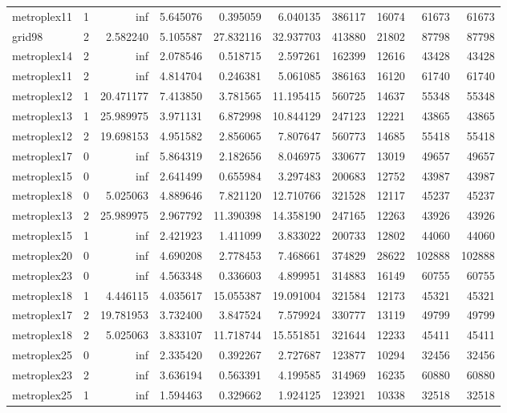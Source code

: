 \begin{longtable}{|l|r|r|r|r|r|r|r|r|r|}
metroplex11 & 1 & inf & 5.645076 & 0.395059 & 6.040135 & 386117 & 16074 & 61673 & 61673 \\
grid98 & 2 & 2.582240 & 5.105587 & 27.832116 & 32.937703 & 413880 & 21802 & 87798 & 87798 \\
metroplex14 & 2 & inf & 2.078546 & 0.518715 & 2.597261 & 162399 & 12616 & 43428 & 43428 \\
metroplex11 & 2 & inf & 4.814704 & 0.246381 & 5.061085 & 386163 & 16120 & 61740 & 61740 \\
metroplex12 & 1 & 20.471177 & 7.413850 & 3.781565 & 11.195415 & 560725 & 14637 & 55348 & 55348 \\
metroplex13 & 1 & 25.989975 & 3.971131 & 6.872998 & 10.844129 & 247123 & 12221 & 43865 & 43865 \\
metroplex12 & 2 & 19.698153 & 4.951582 & 2.856065 & 7.807647 & 560773 & 14685 & 55418 & 55418 \\
metroplex17 & 0 & inf & 5.864319 & 2.182656 & 8.046975 & 330677 & 13019 & 49657 & 49657 \\
metroplex15 & 0 & inf & 2.641499 & 0.655984 & 3.297483 & 200683 & 12752 & 43987 & 43987 \\
metroplex18 & 0 & 5.025063 & 4.889646 & 7.821120 & 12.710766 & 321528 & 12117 & 45237 & 45237 \\
metroplex13 & 2 & 25.989975 & 2.967792 & 11.390398 & 14.358190 & 247165 & 12263 & 43926 & 43926 \\
metroplex15 & 1 & inf & 2.421923 & 1.411099 & 3.833022 & 200733 & 12802 & 44060 & 44060 \\
metroplex20 & 0 & inf & 4.690208 & 2.778453 & 7.468661 & 374829 & 28622 & 102888 & 102888 \\
metroplex23 & 0 & inf & 4.563348 & 0.336603 & 4.899951 & 314883 & 16149 & 60755 & 60755 \\
metroplex18 & 1 & 4.446115 & 4.035617 & 15.055387 & 19.091004 & 321584 & 12173 & 45321 & 45321 \\
metroplex17 & 2 & 19.781953 & 3.732400 & 3.847524 & 7.579924 & 330777 & 13119 & 49799 & 49799 \\
metroplex18 & 2 & 5.025063 & 3.833107 & 11.718744 & 15.551851 & 321644 & 12233 & 45411 & 45411 \\
metroplex25 & 0 & inf & 2.335420 & 0.392267 & 2.727687 & 123877 & 10294 & 32456 & 32456 \\
metroplex23 & 2 & inf & 3.636194 & 0.563391 & 4.199585 & 314969 & 16235 & 60880 & 60880 \\
metroplex25 & 1 & inf & 1.594463 & 0.329662 & 1.924125 & 123921 & 10338 & 32518 & 32518 \\

\end{longtable}

